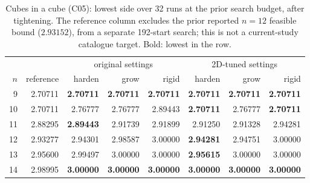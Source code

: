 \begin{table}[t]\centering\small
\begin{tabular}{rrrrrrrr}
\toprule
 & & \multicolumn{3}{c}{original settings} & \multicolumn{3}{c}{2D-tuned settings}\\
$n$ & reference & harden & grow & rigid & harden & grow & rigid\\
\midrule
9 & 2.70711 & \textbf{2.70711} & \textbf{2.70711} & \textbf{2.70711} & \textbf{2.70711} & \textbf{2.70711} & \textbf{2.70711}\\
10 & 2.70711 & 2.76777 & 2.76777 & 2.89443 & \textbf{2.70711} & 2.76777 & \textbf{2.70711}\\
11 & 2.88295 & \textbf{2.89443} & 2.91739 & 2.91899 & 2.91250 & 2.91328 & 2.94281\\
12 & 2.93277 & 2.94301 & 2.98587 & 3.00000 & \textbf{2.94281} & 2.94751 & 3.00000\\
13 & 2.95600 & 2.99497 & 3.00000 & 3.00000 & \textbf{2.95615} & 3.00000 & 3.00000\\
14 & 2.98995 & \textbf{3.00000} & \textbf{3.00000} & \textbf{3.00000} & \textbf{3.00000} & \textbf{3.00000} & \textbf{3.00000}\\
\bottomrule
\end{tabular}
\caption{Cubes in a cube (C05): lowest side over 32 runs at the prior search budget, after tightening. The reference column excludes the prior reported $n=12$ feasible bound ($2.93152$), from a separate 192-start search; this is not a current-study catalogue target. Bold: lowest in the row.}
\label{tab:cubes}
\end{table}
